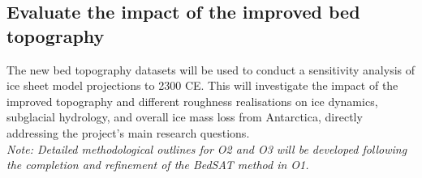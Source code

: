 \subsection{Evaluate the impact of the improved bed topography}

The new bed topography datasets will be used to conduct a sensitivity analysis of ice sheet model projections to 2300 CE. This will investigate the impact of the improved topography and different roughness realisations on ice dynamics, subglacial hydrology, and overall ice mass loss from Antarctica, directly addressing the project's main research questions.
\\
\textit{Note: Detailed methodological outlines for O2 and O3 will be developed following the completion and refinement of the BedSAT method in O1.}


